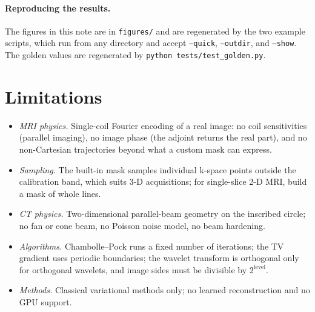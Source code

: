 \documentclass[11pt,a4paper]{article}
\newcommand{\code}[1]{\texttt{#1}}
\begin{document}
\paragraph{Reproducing the results.} The figures in this note are in
\code{figures/} and are regenerated by the two example scripts, which run
from any directory and accept \code{--quick}, \code{--outdir}, and
\code{--show}. The golden values are regenerated by
\code{python tests/test\_golden.py}.

\section{Limitations}\label{sec:limitations}

\begin{itemize}
  \item \emph{MRI physics.} Single-coil Fourier encoding of a real image:
        no coil sensitivities (parallel imaging), no image phase (the adjoint
        returns the real part), and no non-Cartesian trajectories beyond what
        a custom mask can express.
  \item \emph{Sampling.} The built-in mask samples individual k-space points
        outside the calibration band, which suits 3-D acquisitions; for
        single-slice 2-D MRI, build a mask of whole lines.
  \item \emph{CT physics.} Two-dimensional parallel-beam geometry on the
        inscribed circle; no fan or cone beam, no Poisson noise model, no
        beam hardening.
  \item \emph{Algorithms.} Chambolle--Pock runs a fixed number of
        iterations; the TV gradient uses periodic boundaries; the wavelet
        transform is orthogonal only for orthogonal wavelets, and image
        sides must be divisible by $2^{\text{level}}$.
  \item \emph{Methods.} Classical variational methods only; no learned
        reconstruction and no GPU support.
\end{itemize}
\end{document}
